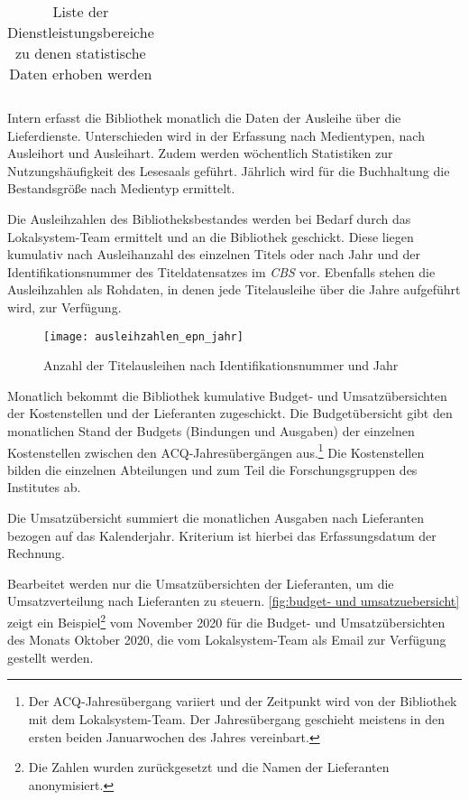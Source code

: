 \begin{table}[h]
\begin{adjustbox}{max width=\textwidth}
\begin{tabular}{lllclllcc}
        \bottomrule
    \end{tabular}
    \end{adjustbox}
    \caption{%
        Liste der Dienstleistungsbereiche zu denen statistische Daten erhoben werden
    \label{tab:Statistische_Daten}
    }
     \end{table}
\endgroup


Intern erfasst die Bibliothek monatlich die Daten der Ausleihe über die Lieferdienste. Unterschieden 
wird in der Erfassung nach Medientypen, nach Ausleihort und Ausleihart. Zudem werden wöchentlich 
Statistiken zur Nutzungshäufigkeit des Lesesaals geführt. Jährlich wird für die Buchhaltung die Bestandsgröße nach 
Medientyp ermittelt.

Die Ausleihzahlen des Bibliotheksbestandes werden bei Bedarf durch das Lokalsystem-Team ermittelt und an die Bibliothek geschickt. 
Diese liegen kumulativ nach Ausleihanzahl des einzelnen Titels oder nach Jahr und der Identifikationsnummer des Titeldatensatzes im 
\textit{\acrshort{CBS}} vor. Ebenfalls stehen die Ausleihzahlen als Rohdaten, in denen jede Titelausleihe über die Jahre aufgeführt wird, zur Verfügung.

\begin{figure}[H]
    \centering
        \texttt{[image: ausleihzahlen\_epn\_jahr]}
        \caption{Anzahl der Titelausleihen nach Identifikationsnummer und Jahr}
        \label{fig:Titelausleihen}
\end{figure}


Monatlich bekommt die Bibliothek kumulative Budget- und Umsatzübersichten der Kostenstellen und der Lieferanten zugeschickt.
Die Budgetübersicht gibt den monatlichen Stand der Budgets (Bindungen und Ausgaben) der einzelnen Kostenstellen zwischen den ACQ-Jahresübergängen aus.\footnote{Der
ACQ-Jahresübergang variiert und der Zeitpunkt wird von der Bibliothek mit dem Lokalsystem-Team. Der Jahresübergang geschieht meistens in den ersten beiden Januarwochen des Jahres vereinbart.}
Die Kostenstellen bilden die einzelnen Abteilungen und zum Teil die Forschungsgruppen des Institutes ab.

Die Umsatzübersicht summiert die monatlichen Ausgaben nach Lieferanten bezogen auf das Kalenderjahr. Kriterium ist hierbei das Erfassungsdatum der Rechnung. 

Bearbeitet werden nur die Umsatzübersichten der Lieferanten, um die Umsatzverteilung nach Lieferanten zu steuern.
\autoref{fig:budget- und umsatzuebersicht} zeigt ein Beispiel\footnote{Die Zahlen wurden zurückgesetzt und die Namen der Lieferanten anonymisiert.} vom November 2020 für die Budget- und Umsatzübersichten des Monats Oktober 2020, die vom Lokalsystem-Team als Email zur Verfügung gestellt werden.


